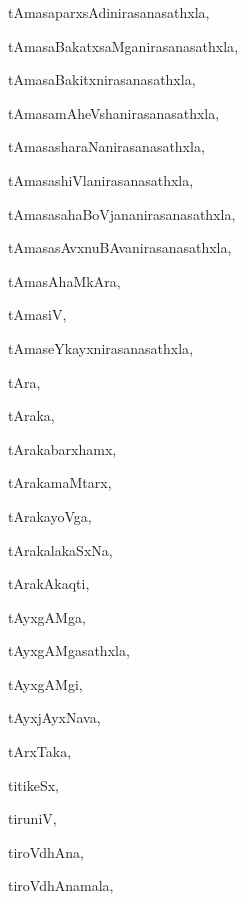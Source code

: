 \begin{multicols}{3}
{\noindent
{tAmasaparxsAdinirasanasathxla}, \pageref{tAmasaparxsAdinirasanasathxla}

\noindent
{tAmasaBakatxsaMganirasanasathxla}, \pageref{tAmasaBakatxsaMganirasanasathxla}

\noindent
{tAmasaBakitxnirasanasathxla}, \pageref{tAmasaBakitxnirasanasathxla}

\noindent
{tAmasamAheVshanirasanasathxla}, \pageref{tAmasamAheVshanirasanasathxla}

\noindent
{tAmasasharaNanirasanasathxla}, \pageref{tAmasasharaNanirasanasathxla}

\noindent
{tAmasashiVlanirasanasathxla}, \pageref{tAmasashiVlanirasanasathxla}

\noindent
{tAmasasahaBoVjananirasanasathxla}, \pageref{tAmasasahaBoVjananirasanasathxla}

\noindent
{tAmasasAvxnuBAvanirasanasathxla}, \pageref{tAmasasAvxnuBAvanirasanasathxla}

\noindent
{tAmasAhaMkAra}, \pageref{tAmasAhaMkAra}

\noindent
{tAmasiV}, \pageref{tAmasiV}

\noindent
{tAmaseYkayxnirasanasathxla}, \pageref{tAmaseYkayxnirasanasathxla}

\noindent
{tAra}, \pageref{tAra}

\noindent
{tAraka}, \pageref{tAraka}

\noindent
{tArakabarxhamx}, \pageref{tArakabarxhamx}

\noindent
{tArakamaMtarx}, \pageref{tArakamaMtarx}

\noindent
{tArakayoVga}, \pageref{tArakayoVga}

\noindent
{tArakalakaSxNa}, \pageref{tArakalakaSxNa}

\noindent
{tArakAkaqti}, \pageref{tArakAkaqti}

\noindent
{tAyxgAMga}, \pageref{tAyxgAMga}

\noindent
{tAyxgAMgasathxla}, \pageref{tAyxgAMgasathxla}

\noindent
{tAyxgAMgi}, \pageref{tAyxgAMgi}

\noindent
{tAyxjAyxNava}, \pageref{tAyxjAyxNava}

\noindent
{tArxTaka}, \pageref{tArxTaka}

\noindent
{titikeSx}, \pageref{titikeSx}

\noindent
{tiruniV{\ru}}, \pageref{tiruniVru}

\noindent
{tiroVdhAna}, \pageref{tiroVdhAna}

\noindent
{tiroVdhAnamala}, \pageref{tiroVdhAnamala}

}
\end{multicols}
